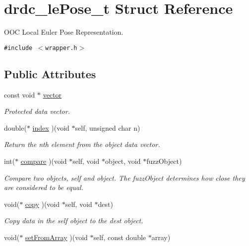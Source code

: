 \hypertarget{structdrdc__lePose__t}{
\section{drdc\_\-lePose\_\-t Struct Reference}
\label{structdrdc__lePose__t}
}
OOC Local Euler Pose Representation.  


{\tt \#include $<$wrapper.h$>$}

\subsection*{Public Attributes}
\begin{CompactItemize}
\item 
const void $\ast$ \hyperlink{structdrdc__lePose__t_d106d91986354f0113a06bc1b3bddd1f}{vector}
\begin{CompactList}\small\item\em Protected data vector. \item\end{CompactList}\item 
double($\ast$ \hyperlink{structdrdc__lePose__t_a4140fbb8270978861d42f119d1b0218}{index} )(void $\ast$self, unsigned char n)
\begin{CompactList}\small\item\em Return the nth element from the object data vector. \item\end{CompactList}\item 
int($\ast$ \hyperlink{structdrdc__lePose__t_37cacd1dd11b7f44570510f8ec3bf6d9}{compare} )(void $\ast$self, void $\ast$object, void $\ast$fuzzObject)
\begin{CompactList}\small\item\em Compare two objects, self and object. The fuzzObject determines how close they are considered to be equal. \item\end{CompactList}\item 
void($\ast$ \hyperlink{structdrdc__lePose__t_6d5330ca33cba9376ec6c5ea1aa2c38c}{copy} )(void $\ast$self, void $\ast$dest)
\begin{CompactList}\small\item\em Copy data in the self object to the dest object. \item\end{CompactList}\item 
void($\ast$ \hyperlink{structdrdc__lePose__t_563282655a158b6e2ea44477d02ef1e3}{setFromArray} )(void $\ast$self, const double $\ast$array)

\end{CompactItemize}
